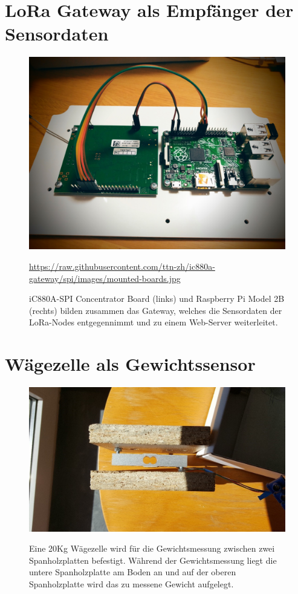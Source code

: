 \section{LoRa Gateway als Empfänger der Sensordaten}
\begin{figure}[ht]
    \center
    \includegraphics[width=15cm]{Bilder/mounted-boards.jpg}\\
    \caption{iC880A-SPI Concentrator Board (links) und Raspberry Pi Model 2B (rechts) bilden zusammen das Gateway, welches die Sensordaten der LoRa-Nodes entgegennimmt und zu einem Web-Server weiterleitet.}
    \begin{flushleft}
        \quelle\url{https://raw.githubusercontent.com/ttn-zh/ic880a-gateway/spi/images/mounted-boards.jpg}
    \end{flushleft}
    \label{fig:UeberblickDerBauteile}
\end{figure}
\newpage
\section{Wägezelle als Gewichtssensor}
\begin{figure}[ht]
    \center
    \includegraphics[width=15cm]{Bilder/waegezelle.jpg}\\
    \caption{Eine 20Kg Wägezelle wird für die Gewichtsmessung zwischen zwei Spanholzplatten befestigt. Während der Gewichtsmessung liegt die untere Spanholzplatte am Boden an und auf der oberen Spanholzplatte wird das zu messene Gewicht aufgelegt.}
    \label{fig:Waegezelle}
\end{figure}
\newpage
